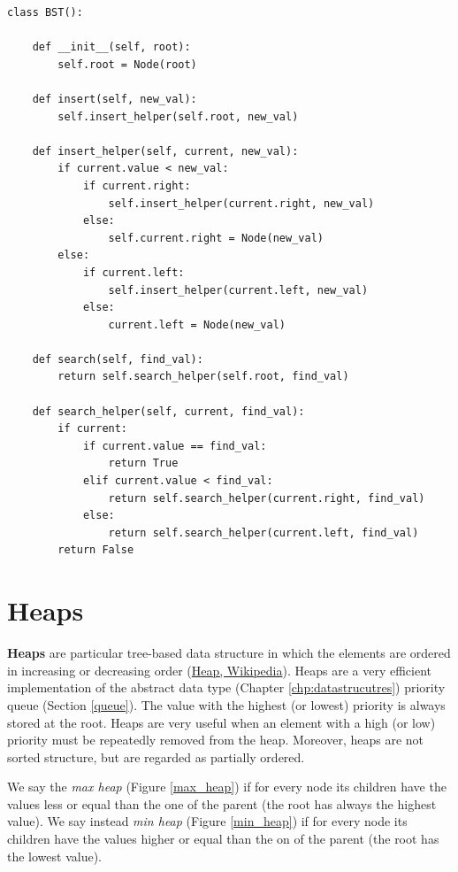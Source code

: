 \begin{lstlisting}[firstnumber=1, caption={implementation of insert and search operation for a binary search tree.}]
class BST():

	def __init__(self, root):
		self.root = Node(root)

	def insert(self, new_val):
		self.insert_helper(self.root, new_val)
	
	def insert_helper(self, current, new_val):
		if current.value < new_val:
			if current.right:
				self.insert_helper(current.right, new_val)
			else:
				self.current.right = Node(new_val)
		else:
			if current.left:
				self.insert_helper(current.left, new_val)
			else:
				current.left = Node(new_val)
	
	def search(self, find_val):
		return self.search_helper(self.root, find_val)
	
	def search_helper(self, current, find_val):
		if current:
			if current.value == find_val:
				return True
			elif current.value < find_val:
				return self.search_helper(current.right, find_val)
			else:
				return self.search_helper(current.left, find_val)
		return False
\end{lstlisting}

\section{Heaps}
\textbf{Heaps} are particular tree-based data structure in which the elements are ordered in increasing or decreasing order \cite{wikiheap} (\href{https://en.wikipedia.org/wiki/Heap_(data_structure)}{Heap, Wikipedia}). Heaps are a very efficient implementation of the abstract data type (Chapter \ref{chp:datastrucutres}) priority queue (Section \ref{queue}). The value with the highest (or lowest) priority is always stored at the root. Heaps are very useful when an element with a high (or low) priority must be repeatedly removed from the heap. Moreover, heaps are not sorted structure, but are regarded as partially ordered.    

We say the \textit{max heap} (Figure \ref{max_heap}) if for every node its children have the values less or equal than the one of the parent (the root has always the highest value). We say instead \textit{min heap} (Figure \ref{min_heap}) if for every node its children have the values higher or equal than the on of the parent (the root has the lowest value).

